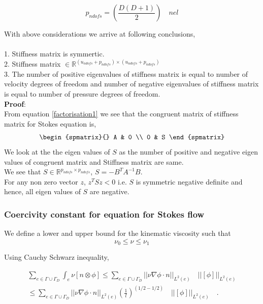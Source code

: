 \documentclass[a4paper]{book}
\begin{document}
\begin{equation} \label{pndofs}
p_{ndofs} = \left(\frac{D(D+1)}{2}\right) \quad nel
\end{equation}

With above considerations we arrive at following conclusions, \\
\\
1. Stiffness matrix is symmertic. \\
2. Stiffness matrix $ \in \mathbb{R}^{(u_{ndofs} + p_{ndofs}) \times (u_{ndofs} + p_{ndofs})}$\\
3. The number of positive eigenvalues of stiffness matrix is equal to number of velocity degrees of freedom and number of negative eigenvalues of stiffness matrix is equal to number of pressure degrees of freedom.\\
\textbf{Proof}:\\
From equation \eqref{factorisation1} we see that the congruent matrix of stiffness matrix for Stokes equation is,
\begin{equation}
\begin{spmatrix}{}
    A & 0 \\
    0 & S
\end{spmatrix}
\end{equation}
We look at the the eigen values of $S$ as the number of positive and negative eigen values of congruent matrix and Stiffness matrix are same.\\
We see that $S \in \mathbb{R}^{p_{ndofs} \times p_{ndofs}}$, $S = - B^T A^{-1} B$.\\ 
For any non zero vector $z$, $z^T S z < 0$ i.e. $S$ is symmetric negative definite and hence, all eigen values of $S$ are negative.

\subsubsection{Coercivity constant for equation for Stokes flow} \label{basics}

We define a lower and upper bound for the kinematic viscosity such that \\
\begin{equation}
\nu_0 \leq \nu \leq \nu_1
\end{equation}

Using Cauchy Schwarz inequality, 

\begin{equation}
\begin{split}
\sum_{e \in \Gamma \cup \Gamma_D} \int_e {\nu}[n \otimes \phi] \leq \sum_{e \in \Gamma \cup \Gamma_D} ||\nu \nabla \phi \cdot n||_{L^2(e)} \quad ||[\phi]||_{L^2(e)} \\ \leq \sum_{e \in \Gamma \cup \Gamma_D} ||\nu \nabla \phi \cdot n||_{L^2(e)} (\frac{1}{l})^{(1/2-1/2)} \quad ||[\phi]||_{L^2(e)} \quad \textrm{.}
\end{split}
\end{equation}
\end{document}

